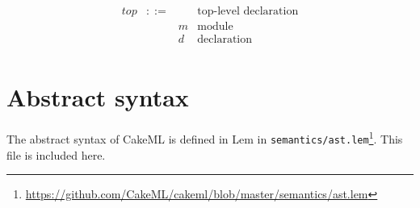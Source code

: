 \documentclass[12pt,a4paper]{book}
\begin{document}
\[
\begin{array}{lcll}
\mathit{top} &::=& &\mbox{top-level declaration}\\
&& m &\mbox{module}\\
&& d &\mbox{declaration}\\
\end{array}
\]



\section{Abstract syntax}

The abstract syntax of CakeML is defined in Lem in \texttt{semantics/ast.lem}\footnote{\url{https://github.com/CakeML/cakeml/blob/master/semantics/ast.lem}}. This file is included here.

{\setlength{\parindent}{0pt}


\LEMTypeLit

\LEMTypeOpn

\LEMTypeOpb

\LEMTypeModN


\LEMTypeVarN

\LEMTypeConN

\LEMTypeTypeN

\LEMTypeTvarN





\LEMTypeOp

\LEMTypeLop

\LEMTypeTctor

\LEMTypeT

\LEMTint

\LEMTstring



\LEMTref

\LEMTwordEight

\LEMTwordEightarray

\LEMTfn

\LEMTexn

\LEMTypePat

\LEMTypeExp

\LEMTypeTypeDef

\LEMTypeDec

\LEMTypeDecs

\LEMTypeSpec

\LEMTypeSpecs

\LEMTypeTop

\LEMTypeProg

\LEMValspecPatBindings

\LEMconstZero
}
\end{document}

